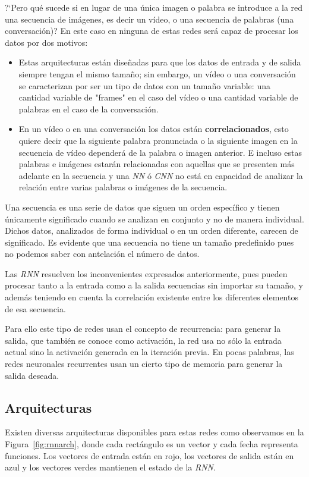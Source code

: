 \documentclass[a4paper,12pt]{article}
\begin{document}
?`Pero qué sucede si en lugar de una única imagen o palabra se introduce a la red una secuencia de imágenes, es decir un vídeo, o una secuencia de palabras (una conversación)? En este caso en ninguna de estas redes será capaz de procesar los datos por dos motivos:
\begin{itemize}[noitemsep, topsep=2pt]
	\item Estas arquitecturas están diseñadas para que los datos de entrada y de salida siempre tengan el mismo tamaño; sin embargo, un vídeo o una conversación se caracterizan por ser un tipo de datos con un tamaño variable: una cantidad variable de "frames"
	      en el caso del vídeo o una cantidad variable de palabras en el caso de la conversación. 
	\item En un vídeo o en una conversación los datos están \textbf{correlacionados}, esto quiere decir que la siguiente palabra pronunciada o la siguiente imagen en la secuencia de vídeo dependerá de la palabra o imagen anterior. E incluso estas palabras e imágenes estarán relacionadas con aquellas que se presenten más adelante en la secuencia y una \textit{NN} ó \textit{CNN} no está en capacidad de analizar la relación entre varias palabras o imágenes de la secuencia.
\end{itemize}

Una secuencia es una serie de datos que siguen un orden específico y tienen únicamente significado cuando se analizan en conjunto y no de manera individual. Dichos datos, analizados de forma individual o en un orden diferente, carecen de significado. Es evidente que una secuencia no tiene un tamaño predefinido pues no podemos saber con antelación el número de datos. 

\clearpage

Las \textit{RNN} resuelven los inconvenientes expresados anteriormente, pues pueden procesar tanto a la entrada como a la salida secuencias sin importar su tamaño, y además teniendo en cuenta la correlación existente entre los diferentes elementos de esa secuencia.

Para ello este tipo de redes usan el concepto de recurrencia: para generar la salida, que también se conoce como activación, la red usa no sólo la entrada actual sino la activación generada en la iteración previa. En pocas palabras, las redes neuronales recurrentes usan un cierto tipo de memoria para generar la salida deseada. 

\subsection{Arquitecturas} \label{rnnarchitecture}
Existen diversas arquitecturas disponibles para estas redes como observamos en la Figura~\ref{fig:rnnarch}, donde cada rectángulo es un vector y cada fecha representa funciones. Los vectores de entrada están en rojo, los vectores de salida están en azul y los vectores verdes mantienen el estado de la \textit{RNN}.
\end{document}
